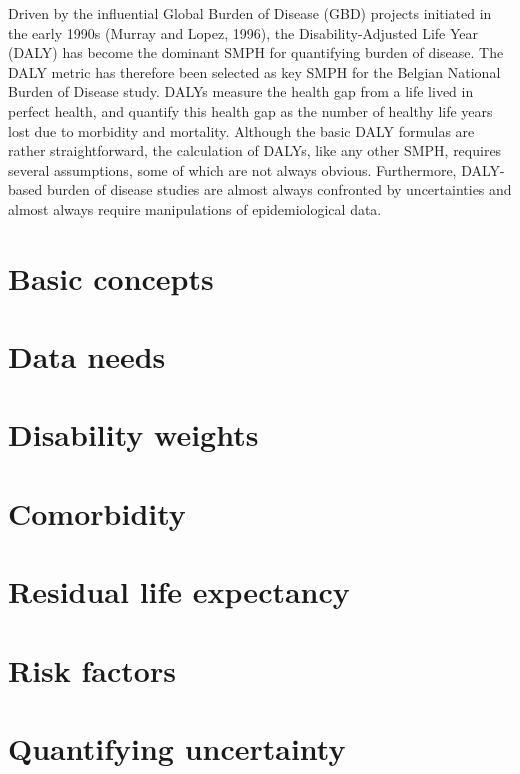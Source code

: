 \documentclass[]{book}
\begin{document}
Driven by the influential Global Burden of Disease (GBD) projects
initiated in the early 1990s (Murray and Lopez, 1996), the
Disability-Adjusted Life Year (DALY) has become the dominant SMPH for
quantifying burden of disease. The DALY metric has therefore been
selected as key SMPH for the Belgian National Burden of Disease study.
DALYs measure the health gap from a life lived in perfect health, and
quantify this health gap as the number of healthy life years lost due to
morbidity and mortality. Although the basic DALY formulas are rather
straightforward, the calculation of DALYs, like any other SMPH, requires
several assumptions, some of which are not always obvious. Furthermore,
DALY-based burden of disease studies are almost always confronted by
uncertainties and almost always require manipulations of epidemiological
data.

\chapter{Basic concepts}\label{basic-concepts}

\chapter{Data needs}\label{data-needs}

\chapter{Disability weights}\label{disability-weights}

\chapter{Comorbidity}\label{comorbidity}

\chapter{Residual life expectancy}\label{residual-life-expectancy}

\chapter{Risk factors}\label{risk-factors}

\chapter{Quantifying uncertainty}\label{quantifying-uncertainty}


\end{document}
